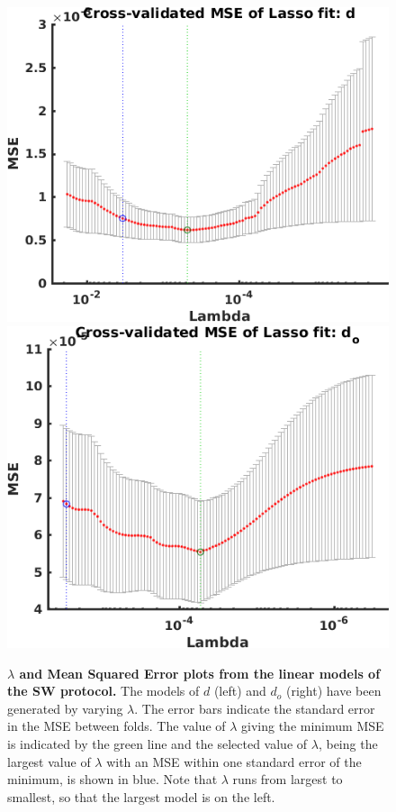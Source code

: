 \documentclass[11pt,a4paper,oneside]{article}
\begin{document}
\begin{figure}[hb]
\begin{center}
\includegraphics[scale=0.42]{Figures/LASSO_SW_AP_full_lambda_d.png}
\includegraphics[scale=0.42]{Figures/LASSO_SW_AP_full_lambda_od.png}
\caption{\textbf{$\lambda$ and Mean Squared Error plots from the linear models of the SW protocol.} The models of $d$ (left) and $d_o$ (right) have been generated by varying $\lambda$. The error bars indicate the standard error in the MSE between folds. The value of $\lambda$ giving the minimum MSE is indicated by the green line and the selected value of $\lambda$, being the largest value of $\lambda$ with an MSE within one standard error of the minimum, is shown in blue. Note that $\lambda$ runs from largest to smallest, so that the largest model is on the left.}
\label{Fig_LASSO_SW_AP_lambda}
\end{center}
\end{figure}
\end{document}
